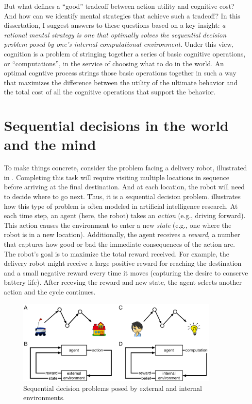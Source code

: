 But what defines a ``good'' tradeoff between action utility and cognitive cost? And how can we identify mental strategies that achieve such a tradeoff? In this dissertation, I suggest answers to these questions based on a key insight: \emph{a rational mental strategy is one that optimally solves the sequential decision problem posed by one's internal computational environment}. Under this view, cognition is a problem of stringing together a series of basic cognitive operations, or ``computations'', in the service of choosing what to do in the world. An optimal cogntive process strings those basic operations together in such a way that maximizes the difference between the utility of the ultimate behavior and the total cost of all the cognitive operations that support the behavior.


\section{Sequential decisions in the world and the mind}

To make things concrete, consider the problem facing a delivery robot, illustrated in . Completing this task will require visiting multiple locations in sequence before arriving at the final destination. And at each location, the robot will need to decide where to go next. Thus, it is a sequential decision problem.  illustrates how this type of problem is often modeled in artificial intelligence research. At each time step, an agent (here, the robot) takes an \emph{action} (e.g., driving forward). This action causes the environment to enter a new \emph{state} (e.g., one where the robot is in a new location). Additionally, the agent receives a \emph{reward}, a number that captures how good or bad the immediate consequences of the action are. The robot's goal is to maximize the total reward received. For example, the delivery robot might receive a large positive reward for reaching the destination and a small negative reward every time it moves (capturing the desire to conserve battery life). After receving the reward and new state, the agent selects another action and the cycle continues.

\begin{figure}[tb]
  \centering
  \includegraphics[width=0.9\textwidth]{diagrams/sequential-intuition.pdf}
  \caption{Sequential decision problems posed by external and internal environments.}
  \label{fig:sequential-intuition}
\end{figure}

